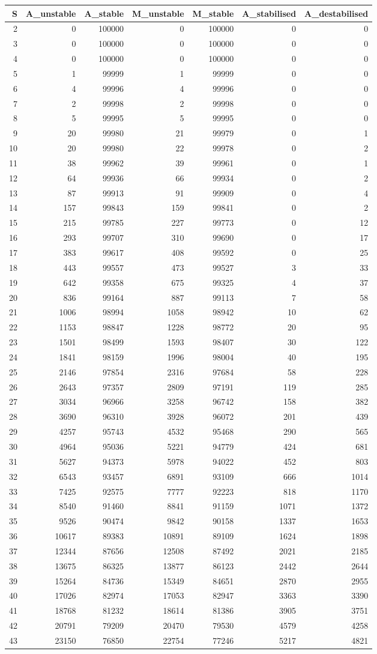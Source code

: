 \documentclass[]{article}
\begin{document}
\begin{longtable}[]{@{}rrrrrrr@{}}
\toprule
S & A\_unstable & A\_stable & M\_unstable & M\_stable & A\_stabilised &
A\_destabilised\tabularnewline
\midrule
\endhead
2 & 0 & 100000 & 0 & 100000 & 0 & 0\tabularnewline
3 & 0 & 100000 & 0 & 100000 & 0 & 0\tabularnewline
4 & 0 & 100000 & 0 & 100000 & 0 & 0\tabularnewline
5 & 1 & 99999 & 1 & 99999 & 0 & 0\tabularnewline
6 & 4 & 99996 & 4 & 99996 & 0 & 0\tabularnewline
7 & 2 & 99998 & 2 & 99998 & 0 & 0\tabularnewline
8 & 5 & 99995 & 5 & 99995 & 0 & 0\tabularnewline
9 & 20 & 99980 & 21 & 99979 & 0 & 1\tabularnewline
10 & 20 & 99980 & 22 & 99978 & 0 & 2\tabularnewline
11 & 38 & 99962 & 39 & 99961 & 0 & 1\tabularnewline
12 & 64 & 99936 & 66 & 99934 & 0 & 2\tabularnewline
13 & 87 & 99913 & 91 & 99909 & 0 & 4\tabularnewline
14 & 157 & 99843 & 159 & 99841 & 0 & 2\tabularnewline
15 & 215 & 99785 & 227 & 99773 & 0 & 12\tabularnewline
16 & 293 & 99707 & 310 & 99690 & 0 & 17\tabularnewline
17 & 383 & 99617 & 408 & 99592 & 0 & 25\tabularnewline
18 & 443 & 99557 & 473 & 99527 & 3 & 33\tabularnewline
19 & 642 & 99358 & 675 & 99325 & 4 & 37\tabularnewline
20 & 836 & 99164 & 887 & 99113 & 7 & 58\tabularnewline
21 & 1006 & 98994 & 1058 & 98942 & 10 & 62\tabularnewline
22 & 1153 & 98847 & 1228 & 98772 & 20 & 95\tabularnewline
23 & 1501 & 98499 & 1593 & 98407 & 30 & 122\tabularnewline
24 & 1841 & 98159 & 1996 & 98004 & 40 & 195\tabularnewline
25 & 2146 & 97854 & 2316 & 97684 & 58 & 228\tabularnewline
26 & 2643 & 97357 & 2809 & 97191 & 119 & 285\tabularnewline
27 & 3034 & 96966 & 3258 & 96742 & 158 & 382\tabularnewline
28 & 3690 & 96310 & 3928 & 96072 & 201 & 439\tabularnewline
29 & 4257 & 95743 & 4532 & 95468 & 290 & 565\tabularnewline
30 & 4964 & 95036 & 5221 & 94779 & 424 & 681\tabularnewline
31 & 5627 & 94373 & 5978 & 94022 & 452 & 803\tabularnewline
32 & 6543 & 93457 & 6891 & 93109 & 666 & 1014\tabularnewline
33 & 7425 & 92575 & 7777 & 92223 & 818 & 1170\tabularnewline
34 & 8540 & 91460 & 8841 & 91159 & 1071 & 1372\tabularnewline
35 & 9526 & 90474 & 9842 & 90158 & 1337 & 1653\tabularnewline
36 & 10617 & 89383 & 10891 & 89109 & 1624 & 1898\tabularnewline
37 & 12344 & 87656 & 12508 & 87492 & 2021 & 2185\tabularnewline
38 & 13675 & 86325 & 13877 & 86123 & 2442 & 2644\tabularnewline
39 & 15264 & 84736 & 15349 & 84651 & 2870 & 2955\tabularnewline
40 & 17026 & 82974 & 17053 & 82947 & 3363 & 3390\tabularnewline
41 & 18768 & 81232 & 18614 & 81386 & 3905 & 3751\tabularnewline
42 & 20791 & 79209 & 20470 & 79530 & 4579 & 4258\tabularnewline
43 & 23150 & 76850 & 22754 & 77246 & 5217 & 4821\tabularnewline

\end{longtable}
\end{document}
